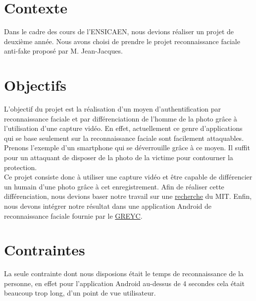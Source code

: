 \section{Contexte}

Dans le cadre des cours de l'ENSICAEN, nous devions réaliser un projet de deuxième année. Nous avons choisi de prendre le projet reconnaissance faciale anti-fake proposé
par M.  Jean-Jacques. 

\section{Objectifs}

L'objectif du projet est la réalisation d'un moyen d'authentification par reconnaissance faciale et par différenciationn de l'homme de la photo  grâce à l'utilisation d'une capture vidéo. En effet, actuellement ce genre d'applications qui se base seulement sur la reconnaissance faciale sont facilement 
attaquables. Prenons l'exemple d'un smartphone qui se déverrouille grâce à ce moyen. Il suffit pour un attaquant de disposer de la photo de la victime pour contourner la protection. \\
Ce projet consiste donc à utiliser une capture vidéo et être capable de différencier un humain d'une photo grâce à cet enregistrement. Afin de réaliser cette différenciation, nous devions baser notre travail sur une \href{http://people.csail.mit.edu/mrub/papers/vidmag.pdf}{recherche} du MIT\@. Enfin, nous devons intégrer notre résultat dans une application Android de reconnaissance faciale fournie par le \href{https://www.greyc.fr/}{GREYC}.

\section{Contraintes}

La seule contrainte dont nous disposions était le temps de reconnaissance de la personne, en effet pour l'application Android au-dessus de 4 secondes cela était beaucoup trop long, d'un point de vue 
utilisateur. 
